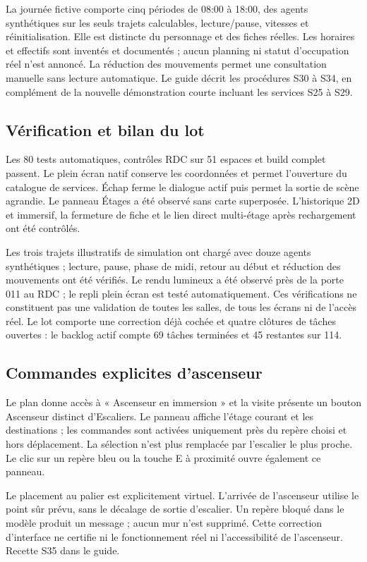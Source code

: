 \documentclass[11pt,a4paper]{article}
\begin{document}
La journée fictive comporte cinq périodes de 08:00 à 18:00, des agents synthétiques sur les seuls trajets calculables, lecture/pause, vitesses et réinitialisation. Elle est distincte du personnage et des fiches réelles. Les horaires et effectifs sont inventés et documentés ; aucun planning ni statut d'occupation réel n'est annoncé. La réduction des mouvements permet une consultation manuelle sans lecture automatique. Le guide décrit les procédures S30 à S34, en complément de la nouvelle démonstration courte incluant les services S25 à S29.

\subsection{Vérification et bilan du lot}
Les 80 tests automatiques, contrôles RDC sur 51 espaces et build complet passent. Le plein écran natif conserve les coordonnées et permet l'ouverture du catalogue de services. Échap ferme le dialogue actif puis permet la sortie de scène agrandie. Le panneau Étages a été observé sans carte superposée. L'historique 2D et immersif, la fermeture de fiche et le lien direct multi-étage après rechargement ont été contrôlés.

Les trois trajets illustratifs de simulation ont chargé avec douze agents synthétiques ; lecture, pause, phase de midi, retour au début et réduction des mouvements ont été vérifiés. Le rendu lumineux a été observé près de la porte 011 au RDC ; le repli plein écran est testé automatiquement. Ces vérifications ne constituent pas une validation de toutes les salles, de tous les écrans ni de l'accès réel. Le lot comporte une correction déjà cochée et quatre clôtures de tâches ouvertes : le backlog actif compte 69 tâches terminées et 45 restantes sur 114.

\subsection{Commandes explicites d'ascenseur}
Le plan donne accès à « Ascenseur en immersion » et la visite présente un bouton Ascenseur distinct d'Escaliers. Le panneau affiche l'étage courant et les destinations ; les commandes sont activées uniquement près du repère choisi et hors déplacement. La sélection n'est plus remplacée par l'escalier le plus proche. Le clic sur un repère bleu ou la touche E à proximité ouvre également ce panneau.

Le placement au palier est explicitement virtuel. L'arrivée de l'ascenseur utilise le point sûr prévu, sans le décalage de sortie d'escalier. Un repère bloqué dans le modèle produit un message ; aucun mur n'est supprimé. Cette correction d'interface ne certifie ni le fonctionnement réel ni l'accessibilité de l'ascenseur. Recette S35 dans le guide.
\end{document}
